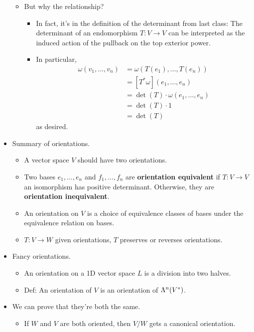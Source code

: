 \documentclass[../notes.tex]{subfiles}
\begin{document}
\begin{itemize}
\begin{itemize}
\begin{itemize}
        \end{itemize}
        \item But why the relationship?
        \begin{itemize}
            \item In fact, it's in the definition of the determinant from last class: The determinant of an endomorphism $T:V\to V$ can be interpreted as the induced action of the pullback on the top exterior power.
            \item In particular,
            \begin{align*}
                \omega(v_1,\dots,v_n) &= \omega(T(e_1),\dots,T(e_n))\\
                &= [T^*\omega](e_1,\dots,e_n)\\
                &= \det(T)\cdot\omega(e_1,\dots,e_n)\\
                &= \det(T)\cdot 1\\
                &= \det(T)
            \end{align*}
            as desired.
        \end{itemize}
    \end{itemize}
    \item Summary of orientations.
    \begin{itemize}
        \item A vector space $V$ should have two orientations.
        \item Two bases $e_1,\dots,e_n$ and $f_1,\dots,f_n$ are \textbf{orientation equivalent} if $T:V\to V$ an isomorphism has positive determinant. Otherwise, they are \textbf{orientation inequivalent}.
        \item An orientation on $V$ is a choice of equivalence classes of bases under the equivalence relation on bases.
        \item $T:V\to W$ given orientations, $T$ preserves or reverses orientations.
    \end{itemize}
    \item Fancy orientations.
    \begin{itemize}
        \item An orientation on a 1D vector space $L$ is a division into two halves.
        \item Def: An orientation of $V$ is an orientation of $\lam[n]{V^*}$.
    \end{itemize}
    \item We can prove that they're both the same.
    \begin{itemize}
        \item If $W$ and $V$ are both oriented, then $V/W$ gets a canonical orientation.
    \end{itemize}
\end{itemize}
\end{document}

